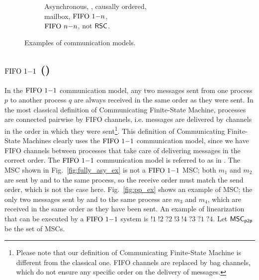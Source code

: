 \begin{figure}[t]
\begin{subfigure}[t]{0.3\textwidth}
		\caption{Asynchronous, \pp, causally ordered, \\mailbox, $\text{FIFO } 1\mathsf{-}n$, \\$\text{FIFO } n\mathsf{-}n$, not $\mathsf{RSC}$.}
	\end{subfigure}
		\caption{Examples of communication models.}
	    \label{fig:co_ex}

	
\end{figure}

\subsection{$\text{FIFO } 1\mathsf{-}1$ (\pp)}
In the $\text{FIFO } 1\mathsf{-}1$ communication model, any two messages sent from one process $p$ to another process $q$ are always received in the same order as they were sent. In the most classical definition of Communicating Finite-State Machine, processes are connected pairwise by FIFO channels, i.e. messages are delivered by channels in the order in which they were sent\footnote{Please note that our definition of Communicating Finite-State Machine is different from the classical one. FIFO channels are replaced by bag channels, which do not ensure any specific order on the delivery of messages.}. This definition of Communicating Finite-State Machines clearly uses the $\text{FIFO } 1\mathsf{-}1$ communication model, since we have FIFO channels between processes that take care of delivering messages in the correct order. The $\text{FIFO } 1\mathsf{-}1$ communication model is referred to as \pp in \cite{DBLP:conf/concur/BolligGFLLS21}. The MSC shown in Fig.~\ref{fig:fully_asy_ex} is not a $\text{FIFO } 1\mathsf{-}1$ MSC; both $m_1$ and $m_2$ are sent by and to the same process, so the receive order must match the send order, which is not the case here. Fig.~\ref{fig:pp_ex} shows an example of \pp MSC; the only two messages sent by and to the same process are $m_3$ and $m_4$, which are received in the same order as they have been sent. An example of linearization that can be executed by a $\text{FIFO } 1\mathsf{-}1$ system is $!1\;!2\;?2\;!3\;!4\;?3\;?1\;?4$. Let $\mathsf{MSC}_{\mathsf{p2p}}$ be the set of \pp MSCs.



